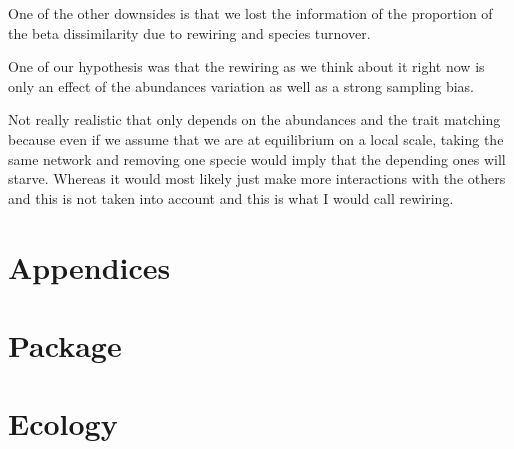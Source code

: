 \documentclass{article}
\begin{document}
One of the other downsides is that we lost the information of the proportion of the beta dissimilarity due to rewiring and species turnover. 

One of our hypothesis was that the rewiring as we think about it right now is only an effect of the abundances variation as well as a strong sampling bias.


Not really realistic that only depends on the abundances and the trait matching because even if we assume that we are at equilibrium on a local scale, taking the same network and removing one specie would imply that the depending ones will starve. Whereas it would most likely just make more interactions with the others and this is not taken into account and this is what I would call rewiring.


\section{Appendices}



\section{Package}



\section{Ecology}
\end{document}
